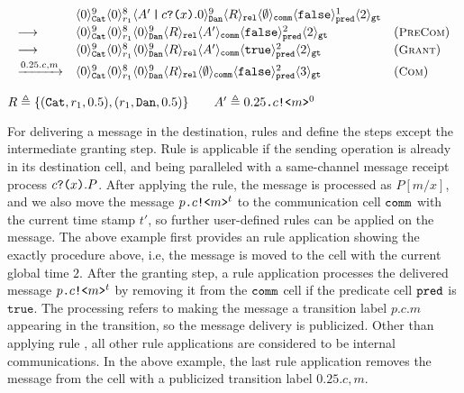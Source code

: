 {\footnotesize
\[
\begin{array}{lll}
&\langle 0 \rangle^{9}_{\texttt{Cat}}\langle 0 \rangle^{8}_{r_1}
\langle A'\,\texttt{|}\,c\texttt{?(}x\texttt{)}.0 \rangle^{9}_{\texttt{Dan}} 
\langle R \rangle_{\texttt{rel}}
\langle \emptyset \rangle_{\texttt{comm}}
\langle \texttt{false} \rangle^{1}_{\texttt{pred}}
\langle 2 \rangle_{\texttt{gt}}
\\[0.2em]
\longrightarrow
&
\langle 0 \rangle^{9}_{\texttt{Cat}}\langle 0 \rangle^{8}_{r_1}
\langle 0 \rangle^{9}_{\texttt{Dan}} 
\langle R \rangle_{\texttt{rel}}
\langle A' \rangle_{\texttt{comm}}
\langle \texttt{false} \rangle^{2}_{\texttt{pred}}
\langle 2 \rangle_{\texttt{gt}}
&
({\small \textsc{PreCom}})
\\[0.2em]
\longrightarrow
&
\langle 0 \rangle^{9}_{\texttt{Cat}}\langle 0 \rangle^{8}_{r_1}
\langle 0 \rangle^{9}_{\texttt{Dan}} 
\langle R \rangle_{\texttt{rel}}
\langle A' \rangle_{\texttt{comm}}
\langle \texttt{true} \rangle^{2}_{\texttt{pred}}
\langle 2 \rangle_{\texttt{gt}}
&
({\small \textsc{Grant}})
\\[0.2em]
\xrightarrow{0.25.c,m}
&
\langle 0 \rangle^{9}_{\texttt{Cat}}\langle 0 \rangle^{8}_{r_1}
\langle 0 \rangle^{9}_{\texttt{Dan}} 
\langle R \rangle_{\texttt{rel}}
\langle \emptyset \rangle_{\texttt{comm}}
\langle \texttt{false} \rangle^{2}_{\texttt{pred}}
\langle 3 \rangle_{\texttt{gt}}
&
({\small \textsc{Com}})
\end{array}
\]
}
{\footnotesize
\begin{center}
$R\triangleq\{(\texttt{Cat},r_1,0.5), (r_1,\texttt{Dan},0.5)\}
\qquad
A'\triangleq0.25\texttt{.}c\texttt{!<}m\texttt{>}^0$
\end{center}
}

For delivering a message in the destination,
rules  and  define the steps except the intermediate granting step.
Rule  is applicable if the sending operation is already in its destination cell, and being paralleled with a same-channel message receipt process $c\texttt{?(}x\texttt{)}.P$. After applying the rule, the message is processed as $P[m/x]$, and we also move the message $p\texttt{.}c\texttt{!<}m\texttt{>}^t$ to the communication cell $\texttt{comm}$ with the current time stamp $t'$, so further user-defined rules can be applied on the message.
The above example first provides an  rule application showing the exactly procedure above, i.e, the message is moved to the  cell with the current global time $2$.
After the granting step,
a  rule application processes the delivered message $p\texttt{.}c\texttt{!<}m\texttt{>}^t$ by removing it from the $\texttt{comm}$ cell if the predicate cell $\texttt{pred}$ is $\texttt{true}$. The processing refers to making the message a transition label $p.c.m$ appearing in the transition,
so the message delivery is publicized. Other than applying rule , all other rule applications are considered to be internal communications. 
In the above example, the last  rule application removes the message from the cell with a publicized transition label $0.25.c,m$. 

